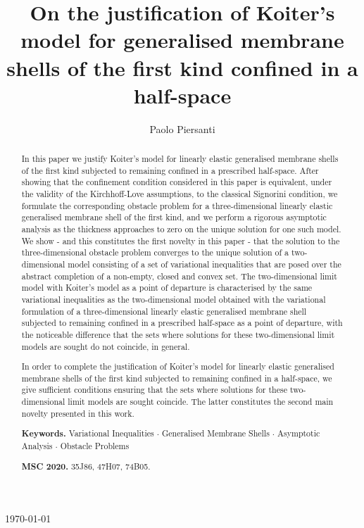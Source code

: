 \documentclass{amsart}
\begin{document}
	
	\today
	
	
	\title[An obstacle problem for generalised membranes]{On the justification of Koiter's model for generalised membrane shells of the first kind confined in a half-space}
	
	
	\author{Paolo Piersanti}
	\address{School of Science and Engineering, The Chinese University of Hong Kong (Shenzhen), 2001 Longxiang Blvd., Longgang District, Shenzhen, China}
	
	
	\begin{abstract}
		In this paper we justify Koiter's model for linearly elastic generalised membrane shells of the first kind subjected to remaining confined in a prescribed half-space. After showing that the confinement condition considered in this paper is equivalent, under the validity of the Kirchhoff-Love assumptions, to the classical Signorini condition, we formulate the corresponding obstacle problem for a three-dimensional linearly elastic generalised membrane shell of the first kind, and we perform a rigorous asymptotic analysis as the thickness approaches to zero on the unique solution for one such model. We show - and this constitutes the first novelty in this paper - that the solution to the three-dimensional obstacle problem converges to the unique solution of a two-dimensional model consisting of a set of variational inequalities that are posed over the abstract completion of a non-empty, closed and convex set. The two-dimensional limit model with Koiter's model as a point of departure is characterised by the same variational inequalities as the two-dimensional model obtained with the variational formulation of a three-dimensional linearly elastic generalised membrane shell subjected to remaining confined in a prescribed half-space as a point of departure, with the noticeable difference that the sets where solutions for these two-dimensional limit models are sought do not coincide, in general.
		
		In order to complete the justification of Koiter's model for linearly elastic generalised membrane shells of the first kind subjected to remaining confined in a half-space, we give sufficient conditions ensuring that the sets where solutions for these two-dimensional limit models are sought coincide. The latter constitutes the second main novelty presented in this work.
		
		\smallskip
		\noindent \textbf{Keywords.} Variational Inequalities $\cdot$ Generalised Membrane Shells $\cdot$ Asymptotic Analysis $\cdot$ Obstacle Problems
		
		\smallskip
		\noindent \textbf{MSC 2020.} 35J86, 47H07, 74B05.
	\end{abstract}
	
\end{document}
